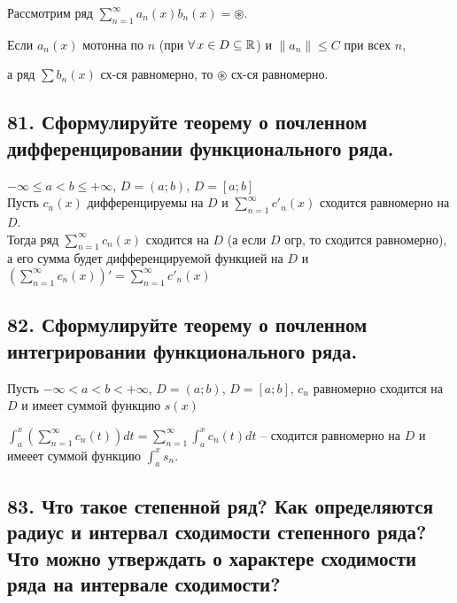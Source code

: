\documentclass[a4paper, fleqn]{article}
\begin{document}
        Рассмотрим ряд $\displaystyle \sum_{n = 1}^{\infty} a_n(x) b_n(x) = \circledast$.
        
        Если $a_n(x)$ мотонна по $n$ (при $\forall \, x \in D \subseteq \mathbb{R}$) и $ \| a_n \| \leq C$ при всех $n$,
        
        а ряд $\sum b_n(x)$ сх-ся равномерно, то $\circledast$ сх-ся равномерно.
        
        
    \subsection*{81. Сформулируйте теорему о почленном дифференцировании функционального ряда.}
    $-\infty \leq a < b \leq +\infty$, $D= (a; b)$, $D = [a; b]$ \\
    Пусть $c_n(x)$ дифференцируемы на $D$ и $\sum_{n=1}^{\infty} c'_n(x)$ сходится равномерно на $D$. \\
    Тогда ряд $\sum_{n=1}^{\infty} c_n(x)$ сходится на $D$ (а если $D$ огр, то сходится равномерно), а его сумма будет дифференцируемой функцией на $D$ и $\left(\sum_{n=1}^{\infty} c_n(x)\right)' = \sum_{n=1}^{\infty} c'_n(x)$ \\
        
        \subsection*{82. Сформулируйте теорему о почленном интегрировании функционального ряда.}
        Пусть $-\infty < a < b < +\infty$, $D= (a; b)$, $D = [a; b]$, $c_n$ равномерно сходится на $D$ и имеет суммой функцию $s(x)$

        $\int_{a}^{x}\left(\sum_{n=1}^{\infty} c_n(t)\right) dt = \sum_{n=1}^{\infty} \int_{a}^{x} c_n(t) dt$ -- сходится равномерно на $D$ и имееет суммой функцию $\int_a^x s_n$.
    
    \subsection*{83. Что такое степенной ряд? Как определяются радиус и интервал сходимости степенного ряда? 
    Что можно утверждать о характере сходимости ряда на интервале сходимости?}
\end{document}
